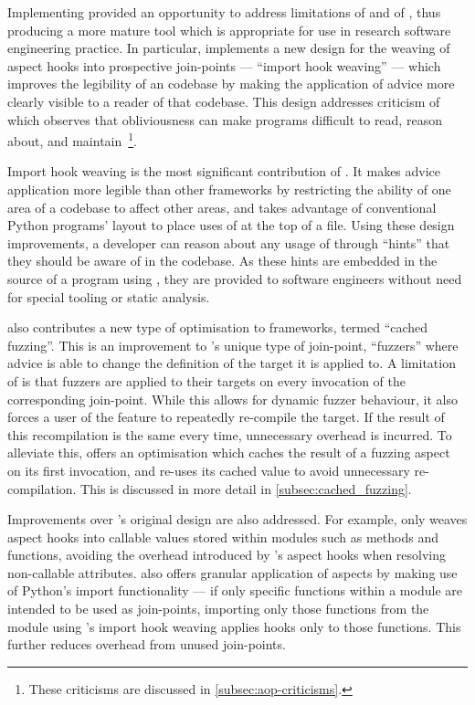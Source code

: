 Implementing \pdsfthree provided an opportunity to address limitations of \aop{}
and of \pydysofu{}, thus producing a more mature tool which is appropriate for
use in research software engineering practice. In particular, \pdsfthree{}
implements a new design for the weaving of aspect hooks into prospective
join-points --- ``import hook weaving'' --- which improves the legibility of an
\aspectoriented codebase by making the application of advice more clearly
visible to a reader of that codebase. This design addresses criticism of
\aspectorientation which observes that obliviousness can make programs difficult
to read, reason about, and
maintain~\cite{Constantinides04aopconsidered,steimann06paradoxical,przybylek2010wrong,przybylek2018empirical}\footnote{These
criticisms are discussed in \cref{subsec:aop-criticisms}.}.

Import hook weaving is the most significant contribution of \pdsfthree{}. It
makes advice application more legible than other \aop{} frameworks by
restricting the ability of one area of a codebase to affect other areas, and
takes advantage of conventional Python programs' layout to place uses of \aop{}
at the top of a file. Using these design improvements, a developer can reason
about any usage of \aop{} through ``hints'' that they should be aware of \aop{}
in the codebase. As these hints are embedded in the source of a program using
\pdsfthree{}, they are provided to software engineers without need for special
tooling or static analysis.

\pdsfthree also contributes a new type of optimisation to \aop{} frameworks,
termed ``cached fuzzing''. This is an improvement to \pydysofu{}'s unique type
of join-point, ``fuzzers'' where advice is able to change the definition of the
target it is applied to. A limitation of \pydysofu is that fuzzers are applied
to their targets on every invocation of the corresponding join-point. While this allows
for dynamic fuzzer behaviour, it also forces a user of the feature to repeatedly
re-compile the target. If the result of this recompilation is the same every
time, unnecessary overhead is incurred. To alleviate this,
\pdsfthree{} offers an optimisation which caches the result of a fuzzing aspect
on its first invocation, and re-uses its cached value to avoid unnecessary
re-compilation. This is discussed in more detail in \cref{subsec:cached_fuzzing}. 

Improvements over \pydysofu{}'s original design are also addressed. For example,
\pdsfthree only weaves aspect hooks into callable values stored within modules
such as methods and functions, avoiding the overhead introduced by \pydysofu{}'s
aspect hooks when resolving non-callable attributes. \pdsfthree also offers
granular application of aspects by making use of Python's import functionality
--- if only specific functions within a module are intended to be used as
join-points, importing only those functions from the module using \pdsfthree{}'s
import hook weaving applies hooks only to those functions. This further reduces
overhead from unused join-points.

